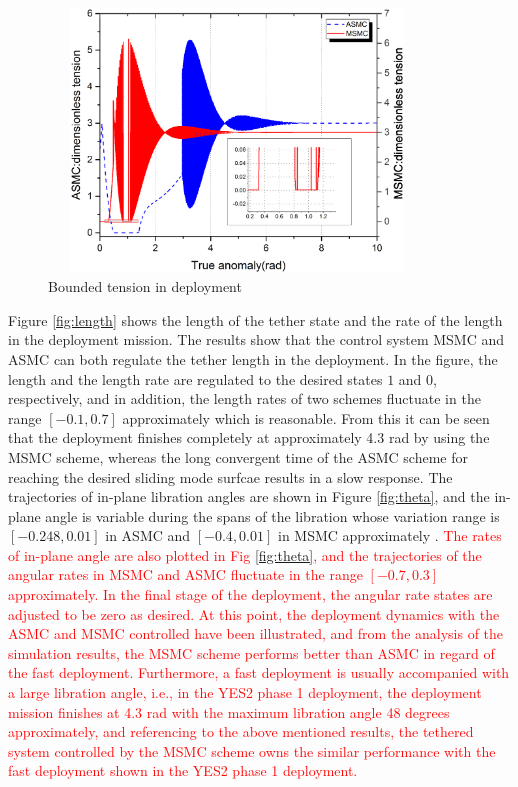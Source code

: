 \documentclass[3p]{elsarticle}
\theoremstyle{plain}
\begin{document}
\begin{figure}
\centering
\includegraphics[width=10cm,height=7cm]{deployment_tension.eps}
\caption{Bounded tension in deployment}
\label{fig:tension}
\end{figure}
Figure \ref{fig:length} shows the length of the tether state and the rate of the length in the deployment mission. The results show that the control system MSMC and ASMC can both regulate the tether length in the deployment. In the figure, the length and the length rate are regulated to the desired states $1$ and $0$, respectively, and in addition, the length rates of two schemes fluctuate in the range $[-0.1,0.7]$ approximately which is reasonable. From this it can be seen that the deployment finishes completely at approximately 4.3 rad by using the MSMC scheme, whereas the long convergent time of the ASMC scheme for reaching the desired sliding mode surfcae results in a slow response. The trajectories of in-plane libration angles are shown in Figure \ref{fig:theta}, and the in-plane angle is variable during the spans of the libration whose variation range is $[-0.248,0.01]$ in ASMC and $[-0.4,0.01]$ in MSMC approximately . \textcolor{red}{ The rates of in-plane angle are also plotted in Fig \ref{fig:theta}, and the trajectories of the angular rates in MSMC and ASMC fluctuate in the range $[-0.7,0.3]$ approximately. In the final stage of the deployment, the angular rate states are adjusted to be zero as desired. At this point, the deployment dynamics with the ASMC and MSMC controlled have been illustrated, and from the analysis of the simulation results, the MSMC scheme performs better than ASMC in regard of the fast deployment. Furthermore, a fast deployment is usually accompanied with a large libration angle, i.e., in the YES2 phase 1 deployment, the deployment mission finishes at 4.3 rad with the maximum libration angle 48 degrees approximately\cite{williams2008deployment}, and referencing to the above mentioned results, the tethered system controlled by the MSMC scheme owns the similar performance with the fast deployment shown in the YES2 phase 1 deployment.}\par
\end{document}
